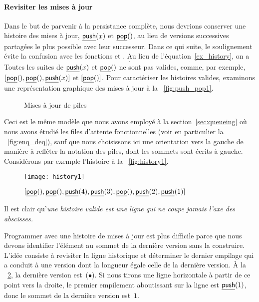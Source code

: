 \paragraph{Revisiter les mises à jour}

Dans le but de parvenir à la persistance complète, nous devrions
conserver une histoire des mises à jour, \(\underline{\textsf{push}}(x)\) et
\(\underline{\textsf{pop}}()\), au lieu de versions
successives partagées le plus possible avec leur successeur. Dans ce
qui suite, le soulignement évite la confusion avec les fonctions
 et
. Au lieu de
l'équation~\eqref{ex_history}, on a
\begin{equation}
[\ufun{push}(4), \ufun{pop}(), \ufun{push}(3), \ufun{push}(2),
\ufun{push}(1)].
\label{ex_history1}
\end{equation}
Toutes les suites de \(\underline{\textsf{push}}(x)\) et \(\underline{\textsf{pop}}()\) ne sont
pas valides, comme, par exemple, \([\underline{\textsf{pop}}(), \underline{\textsf{pop}}(),
  \underline{\textsf{push}}(x)]\) et \([\underline{\textsf{pop}}()]\). Pour caractériser les
histoires valides, examinons une représentation graphique des mises à
jour à la \fig~\vref{fig:push_pop1}.
\begin{figure}
\centering
{}
\qquad
{}
\caption{Mises à jour de piles}
\label{fig:push_pop1}
\end{figure}
Ceci est le même modèle que nous avons employé à la
section~\ref{sec:queueing} où nous avons étudié les files d'attente
fonctionnelles (voir en particulier la \fig~\vref{fig:enq_deq}), sauf
que nous choisissons ici une orientation vers la gauche de manière à
refléter la notation des piles, dont les sommets sont écrits à
gauche. Considérons par exemple l'histoire à la
\fig~\vref{fig:history1}.
\begin{figure}[b]
\centering
\texttt{[image: history1]}
\caption{$[\underline{\textsf{pop}}(), \underline{\textsf{pop}}(), \underline{\textsf{push}}(4),\underline{\textsf{push}}(3),
      \underline{\textsf{pop}}(), \underline{\textsf{push}}(2), \underline{\textsf{push}}(1)]$}
\label{fig:history1}
\end{figure}
Il est clair qu'\emph{une histoire valide est une ligne qui ne coupe
jamais l'axe des abscisses.}

Programmer  avec une histoire de
mises à jour est plus difficile parce que nous devons identifier
l'élément au sommet de la dernière version sans la construire. L'idée
consiste à revisiter la ligne historique et déterminer le dernier
empilage qui a conduit à une version dont la longueur égale celle de
la dernière version. À la \fig~\ref{fig:history1}, la dernière version
est~(\(\bullet\)). Si nous tirons une ligne horizontale à partir de ce
point vers la droite, le premier empilement aboutissant sur la ligne
est \(\underline{\textsf{push}}(1)\), donc le sommet de la dernière version
est~\(1\).

